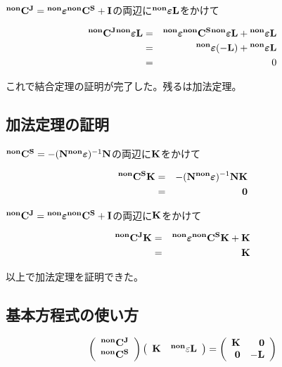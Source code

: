 \({\bf {}^{non}C^J={}^{non}{\boldsymbol \varepsilon}{}^{non}C^S+I}\)の両辺に\({}^{\bf non}{\boldsymbol \varepsilon}{\bf L}\)をかけて

\begin{eqnarray*}
{\bf {}^{non}C^J{}^{non}{\boldsymbol \varepsilon} L } & = & {\bf {}^{non}{\boldsymbol \varepsilon}{}^{non}C^S{}^{non}{\boldsymbol \varepsilon} L+{}^{non}{\boldsymbol\varepsilon} L}\\
& = & {\bf {}^{non}{\boldsymbol \varepsilon}(-L)+{}^{non}{\boldsymbol \varepsilon} L}\\
& = & 0
\end{eqnarray*}

これで結合定理の証明が完了した。残るは加法定理。

\subsection{加法定理の証明}
\({\bf {}^{non}C^S}=-({\bf N {}^{non}{\boldsymbol \varepsilon}})^{-1}{\bf N}\)の両辺に\({\bf K}\)をかけて

\begin{eqnarray*}
{\bf {}^{non}C^SK} & = &-({\bf N {}^{non}{\boldsymbol \varepsilon}})^{-1}{\bf NK}\\
& = & {\bf 0}
\end{eqnarray*}

\({\bf {}^{non}C^J={}^{non}{\boldsymbol \varepsilon}{}^{non}C^S+I}\)の両辺に\({\bf K}\)をかけて

\begin{eqnarray*}
{\bf {}^{non}C^JK} & = & {\bf {}^{non}{\boldsymbol \varepsilon}{}^{non}C^S K+K}\\
& = & {\bf K}
\end{eqnarray*}

以上で加法定理を証明できた。

\subsection{基本方程式の使い方}
\[
\left(
\begin{array}{c}
{\bf {}^{non}C^J}\\
{\bf {}^{non}C^S}
\end{array}
\right)
\left(
\begin{array}{cc}
{\bf K} & {\bf {}^{non}\varepsilon L}\\
\end{array}
\right)
=
\left(
\begin{array}{rr}
{\bf K} & {\bf 0}\\
{\bf 0} & {\bf -L}\\
\end{array}
\right)
\]

